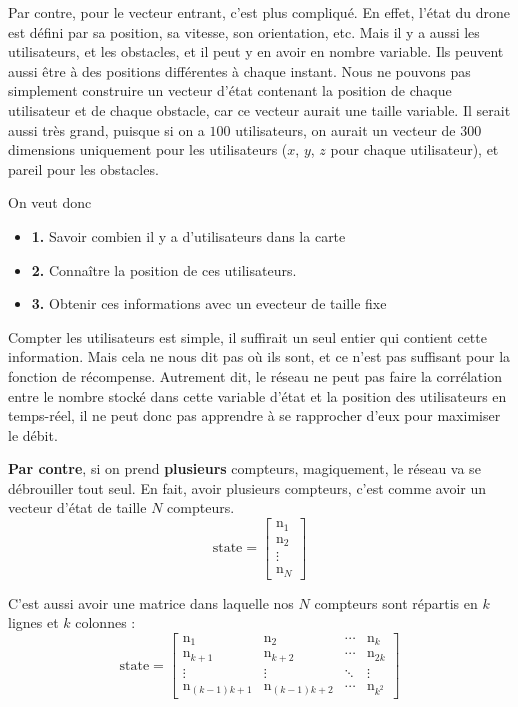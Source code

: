 \documentclass{article}
\begin{document}
Par contre, pour le vecteur entrant, c'est plus compliqué. En effet, l'état du drone est défini par sa position, sa vitesse, son orientation, etc.
Mais il y a aussi les utilisateurs, et les obstacles, et il peut y en avoir en nombre variable. Ils peuvent aussi être à des positions différentes à chaque instant.
Nous ne pouvons pas simplement construire un vecteur d'état contenant la position de chaque utilisateur et de chaque obstacle, car ce vecteur aurait une taille variable.
Il serait aussi très grand, puisque si on a $100$ utilisateurs, on aurait un vecteur de $300$ dimensions uniquement pour les utilisateurs ($x$, $y$, $z$ pour chaque utilisateur), et pareil pour les obstacles.

\vspace{0.5cm}

On veut donc 
\begin{itemize}
    \item \textbf{1.} Savoir combien il y a d'utilisateurs dans la carte
    \item \textbf{2.} Connaître la position de ces utilisateurs.
    \item \textbf{3.} Obtenir ces informations avec un evecteur de taille fixe
\end{itemize}

Compter les utilisateurs est simple, il suffirait un seul entier qui contient cette information.
Mais cela ne nous dit pas où ils sont, et ce n'est pas suffisant pour la fonction de récompense.
Autrement dit, le réseau ne peut pas faire la corrélation entre le nombre stocké dans cette variable d'état
et la position des utilisateurs en temps-réel, il ne peut donc pas apprendre à se rapprocher d'eux pour maximiser le débit.

\vspace{0.5cm}

\textbf{Par contre}, si on prend \textbf{plusieurs} compteurs, magiquement, le réseau va se débrouiller tout seul.
En fait, avoir plusieurs compteurs, c'est comme avoir un vecteur d'état de taille $N$ compteurs.
$$\text{state} = \begin{bmatrix}
\text{n}_1 \\
\text{n}_2 \\
\vdots \\
\text{n}_N
\end{bmatrix}$$

C'est aussi avoir une matrice dans laquelle nos $N$ compteurs sont répartis en $k$ lignes et $k$ colonnes :
$$\text{state} = \left[ \begin{array}{cccc}
\text{n}_1 & \text{n}_2 & \cdots & \text{n}_k \\
\text{n}_{k+1} & \text{n}_{k+2} & \cdots & \text{n}_{2k} \\
\vdots & \vdots & \ddots & \vdots \\
\text{n}_{(k-1)k+1} & \text{n}_{(k-1)k+2} & \cdots & \text{n}_{k^2}
\end{array} \right]$$
\end{document}
